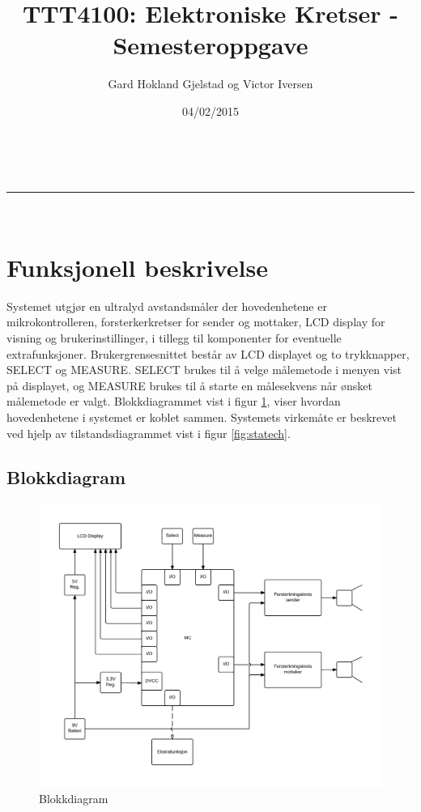 \documentclass[a4paper,11pt]{article}
\makeatletter
\newcommand{\linia}{\rule{\linewidth}{0.5pt}}
\theoremstyle{mytheor}
\renewcommand{\maketitle}{
\begin{center}
\vspace{2ex}
{\huge \textsc{\@title}}
\vspace{1ex}
\\
\linia\\
\@author \hfill \@date
\vspace{4ex}
\end{center}
}
\makeatother
\begin{document}
\title{TTT4100: Elektroniske Kretser - Semesteroppgave}

\author{Gard Hokland Gjelstad og Victor Iversen}

\date{04/02/2015}

\maketitle

\section{Funksjonell beskrivelse}

Systemet utgjør en ultralyd avstandsmåler der hovedenhetene er mikrokontrolleren, forsterkerkretser for sender og mottaker, LCD display for visning og brukerinstillinger, i tillegg til komponenter for eventuelle extrafunksjoner. Brukergrensesnittet består av LCD displayet og to trykknapper, SELECT og MEASURE. SELECT brukes til å velge målemetode i menyen vist på displayet, og MEASURE brukes til å starte en målesekvens når ønsket målemetode er valgt. Blokkdiagrammet vist i figur \ref{fig:blockdia}, viser hvordan hovedenhetene i systemet er koblet sammen. Systemets virkemåte er beskrevet ved hjelp av tilstandsdiagrammet vist i figur \ref{fig:statech}.


\subsection{Blokkdiagram}

\begin{figure}[!htb]
\centering
\includegraphics[width=\textwidth]{project_block_diagram.png}
\caption{\label{fig:blockdia}Blokkdiagram}
\end{figure}
\end{document}
